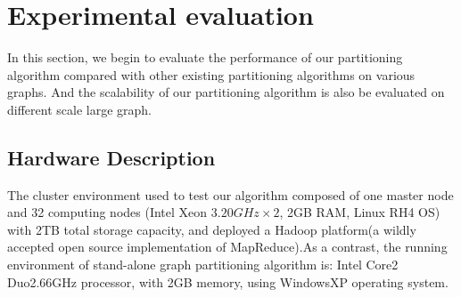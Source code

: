 \documentclass{acm_proc_article-sp}
\begin{document}
\section{Experimental evaluation}
In this section, we begin to evaluate the performance of our partitioning algorithm compared with other existing partitioning algorithms on various graphs. And the scalability of our partitioning algorithm is also be evaluated on different scale large graph.

\subsection {Hardware Description}
The cluster environment used to test our algorithm composed of one master node and 32 computing nodes (Intel Xeon $3.20GHz\times2$, 2GB RAM, Linux RH4 OS) with 2TB total storage capacity, and deployed a Hadoop platform(a wildly accepted open source implementation of MapReduce).As a contrast, the running environment of stand-alone graph partitioning algorithm is: Intel Core2 Duo2.66GHz processor, with 2GB memory, using WindowsXP operating system.
\end{document}
